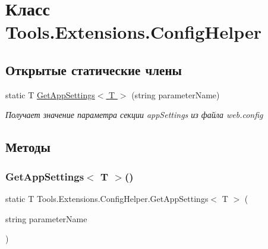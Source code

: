 \hypertarget{class_tools_1_1_extensions_1_1_config_helper}{}\section{Класс Tools.\+Extensions.\+Config\+Helper}
\label{class_tools_1_1_extensions_1_1_config_helper}
\subsection*{Открытые статические члены}
\begin{DoxyCompactItemize}
\item 
static T \hyperlink{class_tools_1_1_extensions_1_1_config_helper_aa5c165a08bdbcbb662363ada14ee85e0}{Get\+App\+Settings$<$ T $>$} (string parameter\+Name)
\begin{DoxyCompactList}\small\item\em Получает значение параметра секции app\+Settings из файла web.\+config \end{DoxyCompactList}\end{DoxyCompactItemize}


\subsection{Методы}
\mbox{\label{class_tools_1_1_extensions_1_1_config_helper_aa5c165a08bdbcbb662363ada14ee85e0}} 
\subsubsection{\texorpdfstring{Get\+App\+Settings$<$ T $>$()}{GetAppSettings< T >()}}
{\footnotesize\ttfamily static T Tools.\+Extensions.\+Config\+Helper.\+Get\+App\+Settings$<$ T $>$ (\begin{DoxyParamCaption}\item[{string}]{parameter\+Name }\end{DoxyParamCaption})\hspace{0.3cm}{\ttfamily [static]}}



